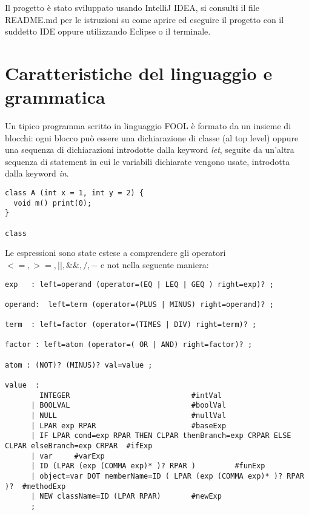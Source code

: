 \documentclass[a4paper]{article}   %
\begin{document}
Il progetto è stato sviluppato usando IntelliJ IDEA, si consulti il file README.md per le istruzioni
su come aprire ed eseguire il progetto con il suddetto IDE oppure utilizzando Eclipse o il terminale.

\section{Caratteristiche del linguaggio e grammatica}

Un tipico programma scritto in linguaggio FOOL è formato da un insieme di blocchi: ogni blocco può essere una dichiarazione di classe (al top level)
oppure una sequenza di dichiarazioni introdotte dalla keyword \textit{let}, seguite da un'altra sequenza di statement in cui le variabili dichiarate vengono usate, introdotta
dalla keyword \textit{in}.\\


\begin{lstlisting}
class A (int x = 1, int y = 2) {
  void m() print(0);
}

class
\end{lstlisting}

Le espressioni sono state estese a comprendere gli operatori $<=, >=, ||, \&\&, /, - $
   e not nella seguente maniera:\\

\begin{lstlisting}
exp   : left=operand (operator=(EQ | LEQ | GEQ ) right=exp)? ;

operand:  left=term (operator=(PLUS | MINUS) right=operand)? ;

term  : left=factor (operator=(TIMES | DIV) right=term)? ;

factor : left=atom (operator=( OR | AND) right=factor)? ;

atom : (NOT)? (MINUS)? val=value ;

value  :
        INTEGER                            #intVal
      | BOOLVAL                            #boolVal
      | NULL                               #nullVal
      | LPAR exp RPAR                      #baseExp
      | IF LPAR cond=exp RPAR THEN CLPAR thenBranch=exp CRPAR ELSE CLPAR elseBranch=exp CRPAR  #ifExp
      | var     #varExp
      | ID (LPAR (exp (COMMA exp)* )? RPAR )         #funExp
      | object=var DOT memberName=ID ( LPAR (exp (COMMA exp)* )? RPAR )?  #methodExp
      | NEW className=ID (LPAR RPAR)       #newExp
      ;

\end{lstlisting}
\end{document}
